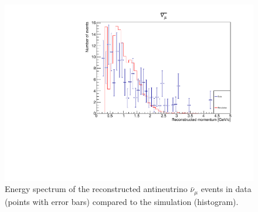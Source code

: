 






\begin{figure}[h!]
\centering
\includegraphics[width=.9\textwidth]{figures/NeutrinoChap/nuBarEventNewest.pdf}
\caption{Energy spectrum of the reconstructed antineutrino $\bar{\nu}_\mu$ events in data (points with error bars) compared to the simulation (histogram).}
\label{fig:datanumubar}
\end{figure}


